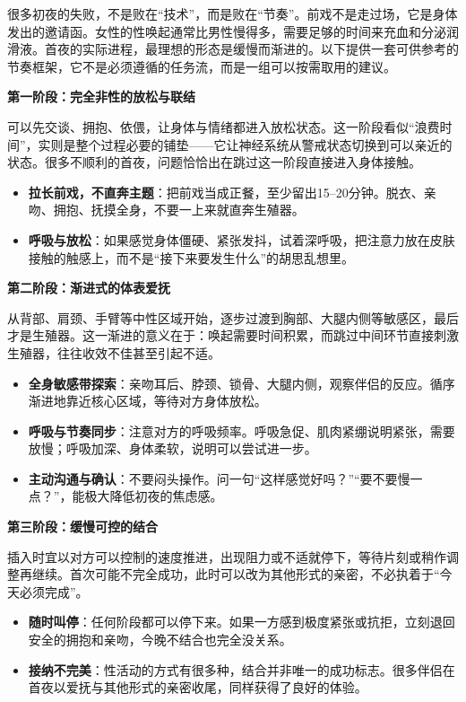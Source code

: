 \documentclass[12pt,UTF8]{ctexbook}
\begin{document}
很多初夜的失败，不是败在“技术”，而是败在“节奏”。前戏不是走过场，它是身体发出的邀请函。女性的性唤起通常比男性慢得多，需要足够的时间来充血和分泌润滑液。首夜的实际进程，最理想的形态是缓慢而渐进的。以下提供一套可供参考的节奏框架，它不是必须遵循的任务流，而是一组可以按需取用的建议。

\textbf{第一阶段：完全非性的放松与联结}

可以先交谈、拥抱、依偎，让身体与情绪都进入放松状态。这一阶段看似“浪费时间”，实则是整个过程必要的铺垫——它让神经系统从警戒状态切换到可以亲近的状态。很多不顺利的首夜，问题恰恰出在跳过这一阶段直接进入身体接触。

\begin{itemize}
\item \textbf{拉长前戏，不直奔主题}：把前戏当成正餐，至少留出15--20分钟。脱衣、亲吻、拥抱、抚摸全身，不要一上来就直奔生殖器。
\item \textbf{呼吸与放松}：如果感觉身体僵硬、紧张发抖，试着深呼吸，把注意力放在皮肤接触的触感上，而不是“接下来要发生什么”的胡思乱想里。
\end{itemize}

\textbf{第二阶段：渐进式的体表爱抚}

从背部、肩颈、手臂等中性区域开始，逐步过渡到胸部、大腿内侧等敏感区，最后才是生殖器。这一渐进的意义在于：唤起需要时间积累，而跳过中间环节直接刺激生殖器，往往收效不佳甚至引起不适。

\begin{itemize}
\item \textbf{全身敏感带探索}：亲吻耳后、脖颈、锁骨、大腿内侧，观察伴侣的反应。循序渐进地靠近核心区域，等待对方身体放松。
\item \textbf{呼吸与节奏同步}：注意对方的呼吸频率。呼吸急促、肌肉紧绷说明紧张，需要放慢；呼吸加深、身体柔软，说明可以尝试进一步。
\item \textbf{主动沟通与确认}：不要闷头操作。问一句“这样感觉好吗？”“要不要慢一点？”，能极大降低初夜的焦虑感。
\end{itemize}

\textbf{第三阶段：缓慢可控的结合}

插入时宜以对方可以控制的速度推进，出现阻力或不适就停下，等待片刻或稍作调整再继续。首次可能不完全成功，此时可以改为其他形式的亲密，不必执着于“今天必须完成”。

\begin{itemize}
\item \textbf{随时叫停}：任何阶段都可以停下来。如果一方感到极度紧张或抗拒，立刻退回安全的拥抱和亲吻，今晚不结合也完全没关系。
\item \textbf{接纳不完美}：性活动的方式有很多种，结合并非唯一的成功标志。很多伴侣在首夜以爱抚与其他形式的亲密收尾，同样获得了良好的体验。
\end{itemize}
\end{document}
